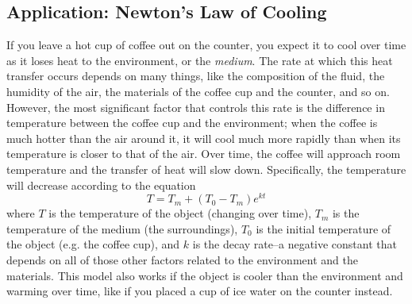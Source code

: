 \subsection{Application: Newton's Law of Cooling}
If you leave a hot cup of coffee out on the counter, you expect it to cool over time as it loses heat to the environment, or the \textit{medium}.  The rate at which this heat transfer occurs depends on many things, like the composition of the fluid, the humidity of the air, the materials of the coffee cup and the counter, and so on.  However, the most significant factor that controls this rate is the difference in temperature between the coffee cup and the environment; when the coffee is much hotter than the air around it, it will cool much more rapidly than when its temperature is closer to that of the air.  Over time, the coffee will approach room temperature and the transfer of heat will slow down.  Specifically, the temperature will decrease according to the equation \[T=T_m+(T_0-T_m)e^{kt}\] where $T$ is the temperature of the object (changing over time), $T_m$ is the temperature of the medium (the surroundings), $T_0$ is the initial temperature of the object (e.g. the coffee cup), and $k$ is the decay rate--a negative constant that depends on all of those other factors related to the environment and the materials.  This model also works if the object is cooler than the environment and warming over time, like if you placed a cup of ice water on the counter instead.\\

